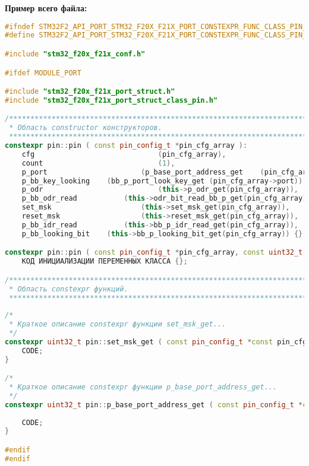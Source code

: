 \textbf{Пример всего файла:}\begin{lstlisting}[language=C++, frame=tlBR, basicstyle=\fontsize{10}{10}\ttfamily]
#ifndef STM32F2_API_PORT_STM32_F20X_F21X_PORT_CONSTEXPR_FUNC_CLASS_PIN_H_
#define STM32F2_API_PORT_STM32_F20X_F21X_PORT_CONSTEXPR_FUNC_CLASS_PIN_H_

#include "stm32_f20x_f21x_conf.h"

#ifdef MODULE_PORT

#include "stm32_f20x_f21x_port_struct.h"
#include "stm32_f20x_f21x_port_struct_class_pin.h"

/**********************************************************************
 * Область constructor конструкторов.
 **********************************************************************/
constexpr pin::pin ( const pin_config_t *pin_cfg_array ):
	cfg								(pin_cfg_array),
	count							(1),
	p_port						(p_base_port_address_get	(pin_cfg_array->port)),
	p_bb_key_looking	(bb_p_port_look_key_get	(pin_cfg_array->port)),
	p_odr							(this->p_odr_get(pin_cfg_array)),
	p_bb_odr_read			(this->odr_bit_read_bb_p_get(pin_cfg_array)),
	set_msk						(this->set_msk_get(pin_cfg_array)),
	reset_msk					(this->reset_msk_get(pin_cfg_array)),
	p_bb_idr_read			(this->bb_p_idr_read_get(pin_cfg_array)),
	p_bb_looking_bit	(this->bb_p_looking_bit_get(pin_cfg_array)) {};

constexpr pin::pin ( const pin_config_t *pin_cfg_array, const uint32_t pin_cout ):
	КОД ИНИЦИАЛИЗАЦИИ ПЕРЕМЕННЫХ КЛАССА {};

/**********************************************************************
 * Область constexpr функций.
 **********************************************************************/
 
/*
 * Краткое описание constexpr функции set_msk_get...
 */
constexpr uint32_t pin::set_msk_get ( const pin_config_t *const pin_cfg_array ) {
	CODE;
}

/*
 * Краткое описание constexpr функции p_base_port_address_get...
 */
constexpr uint32_t pin::p_base_port_address_get ( const pin_config_t *const 
																									pin_cfg_array ) {
	CODE;
}

#endif
#endif
 \end{lstlisting}

